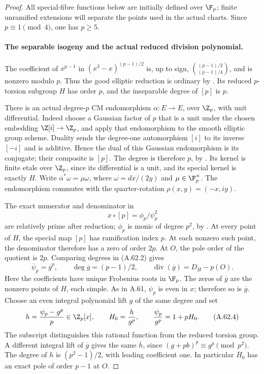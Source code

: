 \begin{proof}
All special-fibre functions below are initially defined over
\(\F_p\); finite unramified extensions will separate the
points used in the actual charts. Since \(p\equiv1\pmod4\),
one has \(p\ge5\).

\paragraph{The separable isogeny and the actual reduced division polynomial.}
The coefficient of \(x^{p-1}\) in
\((x^3-x)^{(p-1)/2}\) is, up to sign,
\(\binom{(p-1)/2}{(p-1)/4}\), and is nonzero modulo \(p\).
Thus the good elliptic reduction is ordinary by
\cite[Theorem V.4.1(a), p.148]{fghSilvermanAEC}.
Its reduced \(p\)-torsion subgroup \(H\) has order \(p\),
and the inseparable degree of \([p]\) is \(p\).

There is an actual degree-\(p\) CM endomorphism
\(\alpha:E\to E\), over \(\Z_p\), with unit differential.
Indeed choose a Gaussian factor of \(p\) that is a unit
under the chosen embedding \(\Z[i]\to\Z_p\), and apply
that endomorphism to the smooth elliptic group scheme.
Duality sends the degree-one automorphism \([i]\)
to its inverse \([-i]\) and is additive. Hence the
dual of this Gaussian endomorphism is its conjugate;
their composite is \([p]\). The degree is therefore
\(p\), by \cite[Theorem III.6.2(a),(c),(d), p.83]{fghSilvermanAEC}.
Its kernel is finite etale over \(\Z_p\), since its
differential is a unit, and its special kernel is exactly
\(H\). Write \(\overline\alpha^*\omega=\mu\omega\),
where \(\omega=dx/(2y)\) and \(\mu\in\F_p^\times\).
The endomorphism commutes with the quarter-rotation
\(\rho(x,y)=(-x,iy)\).

The exact numerator and denominator in
\[
 x\circ[p]=\phi_p/\psi_p^2
                                                        \tag{A.62.2}
\]
are relatively prime after reduction; \(\phi_p\) is monic
of degree \(p^2\), by
\cite[Exercise III.3.7(a)--(d), pp.105--106]{fghSilvermanAEC}.
At every point of \(H\), the special map \([p]\) has
ramification index \(p\). At each nonzero such point,
the denominator therefore has a zero of order \(2p\).
At \(O\), the pole order of the quotient is \(2p\).
Comparing degrees in (A.62.2) gives
\[
 \overline\psi_p=\overline g^p,\qquad
 \deg\overline g=(p-1)/2,\qquad
 \operatorname{div}(\overline g)=D_H-p(O).
                                                        \tag{A.62.3}
\]
Here the coefficients have unique Frobenius roots in
\(\F_p\). The zeros of \(\overline g\) are the nonzero
points of \(H\), each simple. As in A.61, \(\psi_p\)
is even in \(x\); therefore so is \(\overline g\).
Choose an even integral polynomial lift \(g\) of the
same degree and set
\[
 h=\frac{\psi_p-g^p}{p}\in\Z_p[x],\qquad
 H_0=\frac{h}{g^p},\qquad
 \frac{\psi_p}{g^p}=1+pH_0.
                                                        \tag{A.62.4}
\]
The subscript distinguishes this rational function from
the reduced torsion group. A different integral lift of
\(\overline g\) gives the same \(\overline h\), since
\((g+pb)^p\equiv g^p\pmod{p^2}\).
The degree of \(h\) is \((p^2-1)/2\), with leading
coefficient one. In particular \(\overline H_0\) has
an exact pole of order \(p-1\) at \(O\).


\end{proof}
